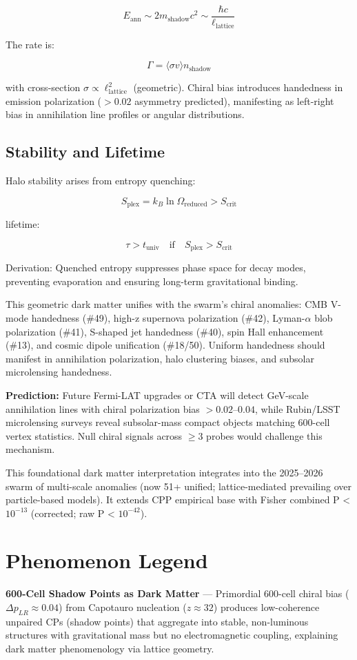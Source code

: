 \documentclass[11pt]{article}
\begin{document}
\[
E_{\text{ann}} \sim 2 m_{\text{shadow}} c^2 \sim \frac{\hbar c}{\ell_{\text{lattice}}}
\]

The rate is:

\[
\Gamma = \langle \sigma v \rangle n_{\text{shadow}}
\]

with cross-section $\sigma \propto \ell_{\text{lattice}}^2$ (geometric). Chiral bias introduces handedness in emission polarization ($> 0.02$ asymmetry predicted), manifesting as left-right bias in annihilation line profiles or angular distributions.

\subsection{Stability and Lifetime}
Halo stability arises from entropy quenching:

\[
S_{\text{plex}} = k_B \ln \Omega_{\text{reduced}} > S_{\text{crit}}
\]

lifetime:

\[
\tau > t_{\text{univ}} \quad \text{if} \quad S_{\text{plex}} > S_{\text{crit}}
\]

Derivation: Quenched entropy suppresses phase space for decay modes, preventing evaporation and ensuring long-term gravitational binding.

This geometric dark matter unifies with the swarm's chiral anomalies: CMB V-mode handedness (\#49), high-z supernova polarization (\#42), Lyman-$\alpha$ blob polarization (\#41), S-shaped jet handedness (\#40), spin Hall enhancement (\#13), and cosmic dipole unification (\#18/50). Uniform handedness should manifest in annihilation polarization, halo clustering biases, and subsolar microlensing handedness.

\textbf{Prediction:} Future Fermi-LAT upgrades or CTA will detect GeV-scale annihilation lines with chiral polarization bias $> 0.02$--$0.04$, while Rubin/LSST microlensing surveys reveal subsolar-mass compact objects matching 600-cell vertex statistics. Null chiral signals across $\geq 3$ probes would challenge this mechanism.

This foundational dark matter interpretation integrates into the 2025--2026 swarm of multi-scale anomalies (now 51+ unified; lattice-mediated prevailing over particle-based models). It extends CPP empirical base with Fisher combined P < $10^{-13}$ (corrected; raw P < $10^{-42}$).

\section{Phenomenon Legend}
\textbf{600-Cell Shadow Points as Dark Matter} — Primordial 600-cell chiral bias ($\Delta p_{LR} \approx 0.04$) from Capotauro nucleation ($z \approx 32$) produces low-coherence unpaired CPs (shadow points) that aggregate into stable, non-luminous structures with gravitational mass but no electromagnetic coupling, explaining dark matter phenomenology via lattice geometry.
\end{document}

